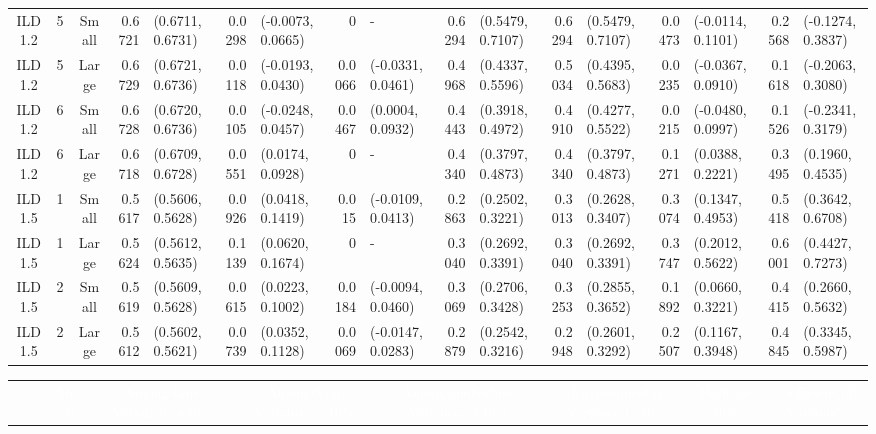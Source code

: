 \begin{landscape}
\begin{table}[!ht]
\begin{tabular}{cccrlrlrlrlrlrlrl}
ILD1.2	&	5	&	Small	&	0.6721	&	(0.6711, 0.6731)	&	0.0298	&	(-0.0073, 0.0665)	&	0	&	-	&	0.6294	&	(0.5479, 0.7107)	&	0.6294	&	(0.5479, 0.7107)	&	0.0473	&	(-0.0114, 0.1101)	&	0.2568	&	(-0.1274, 0.3837)	\\
ILD1.2	&	5	&	Large	&	0.6729	&	(0.6721, 0.6736)	&	0.0118	&	(-0.0193, 0.0430)	&	0.0066	&	(-0.0331, 0.0461)	&	0.4968	&	(0.4337, 0.5596)	&	0.5034	&	(0.4395, 0.5683)	&	0.0235	&	(-0.0367, 0.0910)	&	0.1618	&	(-0.2063, 0.3080)	\\
ILD1.2	&	6	&	Small	&	0.6728	&	(0.6720, 0.6736)	&	0.0105	&	(-0.0248, 0.0457)	&	0.0467	&	(0.0004, 0.0932)	&	0.4443	&	(0.3918, 0.4972)	&	0.4910	&	(0.4277, 0.5522)	&	0.0215	&	(-0.0480, 0.0997)	&	0.1526	&	(-0.2341, 0.3179)	\\
ILD1.2	&	6	&	Large	&	0.6718	&	(0.6709, 0.6728)	&	0.0551	&	(0.0174, 0.0928)	&	0	&	-	&	0.4340	&	(0.3797, 0.4873)	&	0.4340	&	(0.3797, 0.4873)	&	0.1271	&	(0.0388, 0.2221)	&	0.3495	&	(0.1960, 0.4535)	\\
ILD1.5	&	1	&	Small	&	0.5617	&	(0.5606, 0.5628)	&	0.0926	&	(0.0418, 0.1419)	&	0.015	&	(-0.0109, 0.0413)	&	0.2863	&	(0.2502, 0.3221)	&	0.3013	&	(0.2628, 0.3407)	&	0.3074	&	(0.1347, 0.4953)	&	0.5418	&	(0.3642, 0.6708)	\\
ILD1.5	&	1	&	Large	&	0.5624	&	(0.5612, 0.5635)	&	0.1139	&	(0.0620, 0.1674)	&	0	&	-	&	0.3040	&	(0.2692, 0.3391)	&	0.3040	&	(0.2692, 0.3391)	&	0.3747	&	(0.2012, 0.5622)	&	0.6001	&	(0.4427, 0.7273)	\\
ILD1.5	&	2	&	Small	&	0.5619	&	(0.5609, 0.5628)	&	0.0615	&	(0.0223, 0.1002)	&	0.0184	&	(-0.0094, 0.0460)	&	0.3069	&	(0.2706, 0.3428)	&	0.3253	&	(0.2855, 0.3652)	&	0.1892	&	(0.0660, 0.3221)	&	0.4415	&	(0.2660, 0.5632)	\\
ILD1.5	&	2	&	Large	&	0.5612	&	(0.5602, 0.5621)	&	0.0739	&	(0.0352, 0.1128)	&	0.0069	&	(-0.0147, 0.0283)	&	0.2879	&	(0.2542, 0.3216)	&	0.2948	&	(0.2601, 0.3292)	&	0.2507	&	(0.1167, 0.3948)	&	0.4845	&	(0.3345, 0.5987)	\\
\end{tabular}
    \end{table}
\begin{table}
\vspace{-1em}
\centering
        \setlength\tabcolsep{0.3em}
        \tiny
    \begin{tabular}{cccrlrlrlrlrlrlrl}
        &&&	\multicolumn{2}{c}{\textcolor{white}{Mean}} & \multicolumn{2}{c}{\textcolor{white}{Among-Line Variance ($\times10^4$)}}&	\multicolumn{2}{c}{\textcolor{white}{Among-Vial Variance ($\times10^4$)}}& \multicolumn{2}{c}{\textcolor{white}{Among-Individual Variance ($\times10^4$)}} & \multicolumn{2}{c}{\textcolor{white}{Environmental Variance ($\times10^4$)}} & \multicolumn{2}{c}{\textcolor{white}{Heritability}} & \multicolumn{2}{c}{\textcolor{white}{Coefficient of Variance}}\\

\end{tabular}
\end{table}
\end{landscape}
